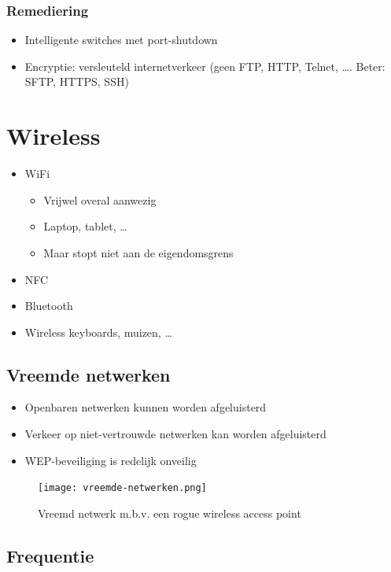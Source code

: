 \documentclass{article}
\begin{document}
\subsubsection{Remediering}
\begin{itemize}
    \item Intelligente switches met port-shutdown
    \item Encryptie: versleuteld internetverkeer (geen FTP, HTTP, Telnet, \dots. Beter: SFTP, HTTPS, SSH)
\end{itemize}

\section{Wireless}

\begin{itemize}
    \item WiFi
    \begin{itemize}
        \item Vrijwel overal aanwezig
        \item Laptop, tablet, \dots
        \item Maar stopt niet aan de eigendomsgrens 
    \end{itemize}
    \item NFC
    \item Bluetooth
    \item Wireless keyboards, muizen, \dots
\end{itemize}

\subsection{Vreemde netwerken}

\begin{itemize}
    \item Openbaren netwerken kunnen worden afgeluisterd
    \item Verkeer op niet-vertrouwde netwerken kan worden afgeluisterd
    \item WEP-beveiliging is redelijk onveilig
\end{itemize}

\begin{figure}[H]
    \centering
    \texttt{[image: vreemde-netwerken.png]}
    \caption{Vreemd netwerk m.b.v. een rogue wireless access point}
\end{figure}

\subsection{Frequentie}
\end{document}
